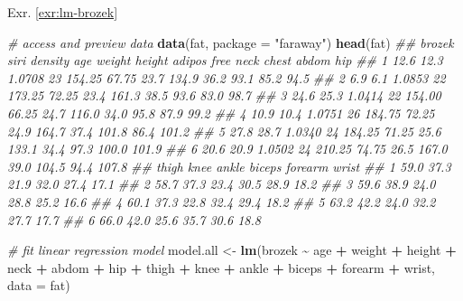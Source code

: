 \documentclass[
]{book}
\newenvironment{Shaded}{\begin{snugshade}}{\end{snugshade}}
\newcommand{\CommentTok}[1]{\textcolor[rgb]{0.56,0.35,0.01}{\textit{#1}}}
\newcommand{\DataTypeTok}[1]{\textcolor[rgb]{0.13,0.29,0.53}{#1}}
\newcommand{\KeywordTok}[1]{\textcolor[rgb]{0.13,0.29,0.53}{\textbf{#1}}}
\newcommand{\NormalTok}[1]{#1}
\newcommand{\OperatorTok}[1]{\textcolor[rgb]{0.81,0.36,0.00}{\textbf{#1}}}
\newcommand{\StringTok}[1]{\textcolor[rgb]{0.31,0.60,0.02}{#1}}
\theoremstyle{definition}
\theoremstyle{definition}
\theoremstyle{definition}
\theoremstyle{remark}
\begin{document}
Exr. \ref{exr:lm-brozek}

\begin{Shaded}
\begin{Highlighting}[]
\CommentTok{\# access and preview data}
\KeywordTok{data}\NormalTok{(fat, }\DataTypeTok{package =} \StringTok{"faraway"}\NormalTok{)}
\KeywordTok{head}\NormalTok{(fat)}
\CommentTok{\#\#   brozek siri density age weight height adipos  free neck chest abdom   hip}
\CommentTok{\#\# 1   12.6 12.3  1.0708  23 154.25  67.75   23.7 134.9 36.2  93.1  85.2  94.5}
\CommentTok{\#\# 2    6.9  6.1  1.0853  22 173.25  72.25   23.4 161.3 38.5  93.6  83.0  98.7}
\CommentTok{\#\# 3   24.6 25.3  1.0414  22 154.00  66.25   24.7 116.0 34.0  95.8  87.9  99.2}
\CommentTok{\#\# 4   10.9 10.4  1.0751  26 184.75  72.25   24.9 164.7 37.4 101.8  86.4 101.2}
\CommentTok{\#\# 5   27.8 28.7  1.0340  24 184.25  71.25   25.6 133.1 34.4  97.3 100.0 101.9}
\CommentTok{\#\# 6   20.6 20.9  1.0502  24 210.25  74.75   26.5 167.0 39.0 104.5  94.4 107.8}
\CommentTok{\#\#   thigh knee ankle biceps forearm wrist}
\CommentTok{\#\# 1  59.0 37.3  21.9   32.0    27.4  17.1}
\CommentTok{\#\# 2  58.7 37.3  23.4   30.5    28.9  18.2}
\CommentTok{\#\# 3  59.6 38.9  24.0   28.8    25.2  16.6}
\CommentTok{\#\# 4  60.1 37.3  22.8   32.4    29.4  18.2}
\CommentTok{\#\# 5  63.2 42.2  24.0   32.2    27.7  17.7}
\CommentTok{\#\# 6  66.0 42.0  25.6   35.7    30.6  18.8}

\CommentTok{\# fit linear regression model}
\NormalTok{model.all \textless{}{-}}\StringTok{ }\KeywordTok{lm}\NormalTok{(brozek }\OperatorTok{\textasciitilde{}}\StringTok{ }\NormalTok{age }\OperatorTok{+}\StringTok{ }\NormalTok{weight }\OperatorTok{+}\StringTok{ }\NormalTok{height }\OperatorTok{+}\StringTok{ }\NormalTok{neck }\OperatorTok{+}\StringTok{ }\NormalTok{abdom }\OperatorTok{+}\StringTok{ }\NormalTok{hip }\OperatorTok{+}\StringTok{ }\NormalTok{thigh }\OperatorTok{+}\StringTok{ }\NormalTok{knee }\OperatorTok{+}\StringTok{ }\NormalTok{ankle }\OperatorTok{+}\StringTok{ }\NormalTok{biceps }\OperatorTok{+}\StringTok{ }\NormalTok{forearm }\OperatorTok{+}\StringTok{ }\NormalTok{wrist, }\DataTypeTok{data =}\NormalTok{ fat)}


\end{Highlighting}
\end{Shaded}
\end{document}
